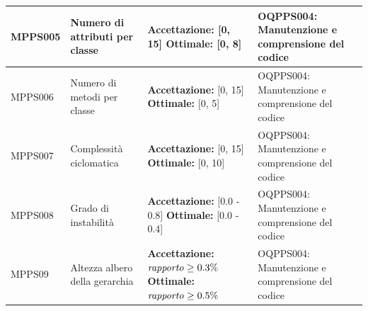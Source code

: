 \documentclass[openany,12pt,a4paper]{report}
\begin{document}
\begin{longtable}{| p{2cm} | p{3.5cm} |p{5.5cm} | p{5.5cm} |}
		\hline
		
		\newline MPPS005 &
		\newline Numero di attributi per classe &
		\newline \textbf{Accettazione:} [0, 15] 
		\newline \textbf{Ottimale:} [0, 8] &
		\newline OQPPS004: Manutenzione e comprensione del codice
		\\[1em]
		
		\hline
		
		\newline MPPS006 &
		\newline Numero di metodi per classe &
		\newline \textbf{Accettazione:} [0, 15] 
		\newline \textbf{Ottimale:} [0, 5] &
		\newline OQPPS004: Manutenzione e comprensione del codice 
		\\[1em]
		
		\hline
		
		\newline MPPS007 &
		\newline Complessità ciclomatica &
		\newline \textbf{Accettazione:} [0, 15] 
		\newline \textbf{Ottimale:} [0, 10] &
		\newline OQPPS004: Manutenzione e comprensione del codice 
		\\[1em]
		
		\hline
		
		\newline MPPS008 &
		\newline Grado di instabilità &
		\newline \textbf{Accettazione:} [0.0 - 0.8] 
		\newline \textbf{Ottimale:} [0.0 - 0.4]&
		\newline OQPPS004: Manutenzione e comprensione del codice 
		\\[1em]
		
		\hline
		
		\newline MPPS09 &
		\newline Altezza albero della gerarchia &
		\newline \textbf{Accettazione:} \newline $ \textrm{\textit{rapporto}} \geq 0.3\% $
		\newline \textbf{Ottimale:} $ \textrm{\textit{rapporto}} \geq 0.5\% $&
		\newline OQPPS004: Manutenzione e comprensione del codice 
		\\[1em]
		

\end{longtable}
\end{document}

